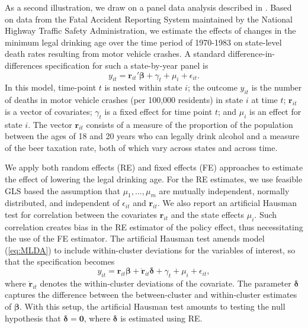 \documentclass[12pt]{article}\usepackage[]{graphicx}\usepackage[]{color}
\newcommand{\bm}{\mathbf}
\newcommand{\bs}{\boldsymbol}
\begin{document}
As a second illustration, we draw on a panel data analysis described in \citet[see also \citealp{Carpenter2011minimum}]{Angrist2014mastering}.
Based on data from the Fatal Accident Reporting System maintained by the National Highway Traffic Safety Administration, we estimate the effects of changes in the minimum legal drinking age over the time period of 1970-1983 on state-level death rates resulting from motor vehicle crashes.
A standard difference-in-differences specification for such a state-by-year panel is
\begin{equation}
\label{eq:MLDA}
y_{it} = \bm{r}_{it}'\bs\beta + \gamma_t + \mu_i + \epsilon_{it}.
\end{equation}
In this model, time-point $t$ is nested within state $i$; the outcome $y_{it}$ is the number of deaths in motor vehicle crashes (per 100,000 residents) in state $i$ at time $t$; $\bm{r}_{it}$ is a vector of covariates; $\gamma_t$ is a fixed effect for time point $t$; and $\mu_i$ is an effect for state $i$. The vector $\bm{r}_{it}$ consists of a measure of the proportion of the population between the ages of 18 and 20 years who can legally drink alcohol and a measure of the beer taxation rate, both of which vary across states and across time.

We apply both random effects (RE) and fixed effects (FE) approaches to estimate the effect of lowering the legal drinking age. 
For the RE estimates, we use feasible GLS based the assumption that  $\mu_1,...,\mu_m$ are mutually independent, normally distributed, and independent of $\epsilon_{it}$ and $\bm{r}_{it}$.
We also report an artificial Hausman test \citep{Arellano1993on, Wooldridge2010econometric} for correlation between the covariates $\bm{r}_{it}$ and the state effects $\mu_i$. Such correlation creates bias in the RE estimator of the policy effect, thus necessitating the use of the FE estimator.
The artificial Hausman test amends model (\ref{eq:MLDA}) to include within-cluster deviations for the variables of interest, so that the specification becomes
\begin{equation}
y_{it} = \bm{r}_{it}\bs\beta + \bm{\ddot{r}}_{it}\bs\delta + \gamma_t + \mu_i + \epsilon_{it},
\end{equation}
where $\bm{\ddot{r}}_{it}$ denotes the within-cluster deviations of the covariate.
The parameter $\bs\delta$ captures the difference between the between-cluster and within-cluster estimates of $\bs\beta$. 
With this setup, the artificial Hausman test amounts to testing the null hypothesis that $\bs\delta = \bm{0}$, where $\bs\delta$ is estimated using RE.  
\end{document}
